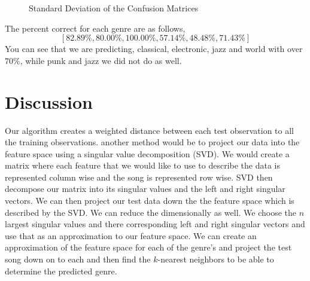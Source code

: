 \documentclass[12pt]{article}
\begin{document}
\begin{figure}[h!]
\centering

\caption{Standard Deviation of the Confusion Matrices} 
\label{fig:stdconfMat}
\end{figure}

The percent correct for each genre are as follows,
\[ [82.89\%, 80.00\%, 100.00\%, 57.14\%, 48.48\%, 71.43\%] \]
You can see that we are predicting, classical, electronic, jazz  and world with over $70\%$, while punk and jazz we did not do as well. 




\section{Discussion}

Our algorithm creates a weighted distance between each test observation to all the training observations. another method would be to project our data into the feature space using a singular value decomposition (SVD). We would create a matrix where each feature that we would like to use to describe the data is represented column wise and the song is represented row wise. SVD then decompose our matrix into its singular values and the left and right singular vectors. We can then project our test data down the the feature space which is described by the SVD. We can reduce the dimensionally as well. We choose the $n$ largest singular values and there corresponding left and right singular vectors and use that as an approximation to our feature space. We can create an approximation of the feature space for each of the genre's and project the test song down on to each and then find the $k$-nearest neighbors to be able to determine the predicted genre. 




\end{document}
